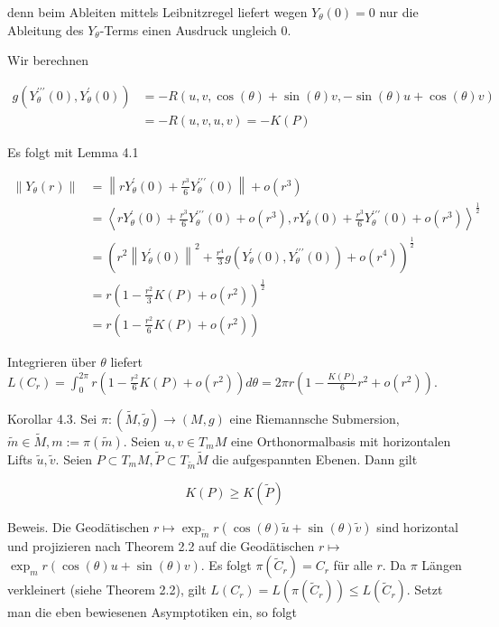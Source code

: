 \documentclass[10pt]{article}
\begin{document}
denn beim Ableiten mittels Leibnitzregel liefert wegen $Y_{\theta}(0)=0$ nur die Ableitung des $Y_{\theta}$-Terms einen Ausdruck ungleich 0.

Wir berechnen

$$
\begin{aligned}
g\left(Y_{\theta}^{\prime \prime \prime}(0), Y_{\theta}^{\prime}(0)\right) & =-R(u, v, \cos (\theta)+\sin (\theta) v,-\sin (\theta) u+\cos (\theta) v) \\
& =-R(u, v, u, v)=-K(P)
\end{aligned}
$$

Es folgt mit Lemma 4.1

$$
\begin{aligned}
\left\|Y_{\theta}(r)\right\| & =\left\|r Y_{\theta}^{\prime}(0)+\frac{r^{3}}{6} Y_{\theta}^{\prime \prime \prime}(0)\right\|+o\left(r^{3}\right) \\
& =\left\langle r Y_{\theta}^{\prime}(0)+\frac{r^{3}}{6} Y_{\theta}^{\prime \prime \prime}(0)+o\left(r^{3}\right), r Y_{\theta}^{\prime}(0)+\frac{r^{3}}{6} Y_{\theta}^{\prime \prime \prime}(0)+o\left(r^{3}\right)\right\rangle^{\frac{1}{2}} \\
& =\left(r^{2}\left\|Y_{\theta}^{\prime}(0)\right\|^{2}+\frac{r^{4}}{3} g\left(Y_{\theta}^{\prime}(0), Y_{\theta}^{\prime \prime \prime}(0)\right)+o\left(r^{4}\right)\right)^{\frac{1}{2}} \\
& =r\left(1-\frac{r^{2}}{3} K(P)+o\left(r^{2}\right)\right)^{\frac{1}{2}} \\
& =r\left(1-\frac{r^{2}}{6} K(P)+o\left(r^{2}\right)\right)
\end{aligned}
$$

Integrieren über $\theta$ liefert\\
$L\left(C_{r}\right)=\int_{0}^{2 \pi} r\left(1-\frac{r^{2}}{6} K(P)+o\left(r^{2}\right)\right) d \theta=2 \pi r\left(1-\frac{K(P)}{6} r^{2}+o\left(r^{2}\right)\right)$.

Korollar 4.3. Sei $\pi:(\tilde{M}, \tilde{g}) \rightarrow(M, g)$ eine Riemannsche Submersion, $\tilde{m} \in \tilde{M}, m:=\pi(\tilde{m})$. Seien $u, v \in T_{m} M$ eine Orthonormalbasis mit horizontalen Lifts $\tilde{u}, \tilde{v}$. Seien $P \subset T_{m} M, \tilde{P} \subset T_{\tilde{m}} \tilde{M}$ die aufgespannten Ebenen. Dann gilt

$$
K(P) \geq K(\tilde{P})
$$

Beweis. Die Geodätischen $r \mapsto \exp _{\tilde{m}} r(\cos (\theta) \tilde{u}+\sin (\theta) \tilde{v})$ sind horizontal und projizieren nach Theorem 2.2 auf die Geodätischen $r \mapsto$ $\exp _{m} r(\cos (\theta) u+\sin (\theta) v)$. Es folgt $\pi\left(\tilde{C}_{r}\right)=C_{r}$ für alle $r$. Da $\pi$ Längen verkleinert (siehe Theorem 2.2), gilt $L\left(C_{r}\right)=L\left(\pi\left(\tilde{C}_{r}\right)\right) \leq L\left(\tilde{C}_{r}\right)$. Setzt man die eben bewiesenen Asymptotiken ein, so folgt
\end{document}
